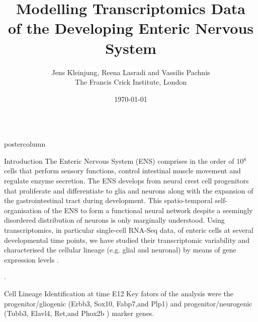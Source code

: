 \documentclass{beamer}
\title{\huge  Modelling Transcriptomics Data \\of the Developing Enteric Nervous System}
\author{Jens Kleinjung, Reena Lasradi and Vassilis Pachnis\\The Francis Crick Institute, London}
\institute[]{The Francis Crick Institute}
\date{\today}
\newlength{\columnheight}
\begin{document}
\begin{frame}
\begin{columns}
\begin{column}{.45\textwidth}
\begin{beamercolorbox}[center]{postercolumn}
\begin{minipage}{.98\textwidth}  %
\parbox[t][\columnheight]{\textwidth}{ %

\begin{myblock}{Introduction}
The Enteric Nervous System (ENS) comprises in the order of 10$^8$ cells that
perform sensory functions, control intestinal muscle movement and regulate
enzyme secretion. The ENS develops from neural crest cell progenitors that
proliferate and differentiate to glia and neurons along with the expansion
of the gastrointestinal tract during development.
This spatio-temporal self-organisation of the ENS to form a functional
neural network despite a seemingly disordered distribution of neurons is
only marginally understood.
Using transcriptomics, in particular single-cell RNA-Seq data, of enteric
cells at several developmental time points, we have studied their
transcriptomic variability and characterised the cellular lineage
(e.g. glial and neuronal) by means of gene expression levels \cite{Lasrado_2017}.

\cite{}.
\end{myblock}\vfill
\begin{myblock}{Cell Lineage Identification at time E12}
Key fators of the analysis were the
progenitor/gliogenic (Erbb3, Sox10, Fabp7,and Plp1) and
progenitor/neurogenic (Tubb3, Elavl4, Ret,and Phox2b )
marker genes.


\end{myblock}}
\end{minipage}
\end{beamercolorbox}
\end{column}
\end{columns}
\end{frame}
\end{document}
